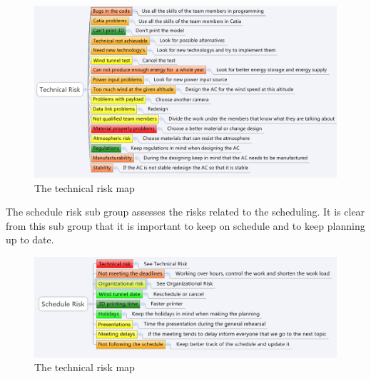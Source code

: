 \documentclass[a4paper]{report}
\begin{document}
\begin{figure}[H]
\label{fig:risktech}
\centering
\includegraphics[scale=0.6]{Figures/riskmindtech.png}
\caption{The technical risk map }
\end{figure}

The schedule risk sub group assesses the risks related to the scheduling. It is clear from this sub group that it is important to keep on schedule and to keep planning up to date.  


\begin{figure}[H]
\label{fig:riskschedule}
\centering
\includegraphics[scale=0.6]{Figures/riskmindschedule.png}
\caption{The technical risk map }
\end{figure}
\end{document}
